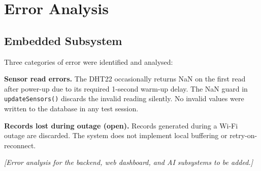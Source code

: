 \section{Error Analysis}

\subsection{Embedded Subsystem}

Three categories of error were identified and analysed:

\textbf{Sensor read errors.}
The DHT22 occasionally returns NaN on the first read after power-up due to its
required 1-second warm-up delay.
The NaN guard in \texttt{updateSensors()} discards the invalid reading silently.
No invalid values were written to the database in any test session.

\textbf{Records lost during outage (open).}
Records generated during a Wi-Fi outage are discarded.
The system does not implement local buffering or retry-on-reconnect.

\begin{center}
	\textit{[Error analysis for the backend, web dashboard, and AI subsystems to be added.]}
\end{center}
